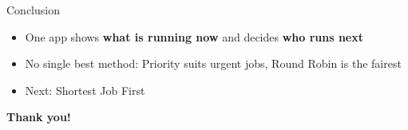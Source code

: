 \documentclass[aspectratio=169,11pt]{beamer}
\begin{document}
\begin{frame}{Conclusion}
  \begin{itemize}
    \item One app shows \textbf{what is running now} and decides \textbf{who runs next}
    \item No single best method: Priority suits urgent jobs, Round Robin is the fairest
    \item Next: Shortest Job First
  \end{itemize}
  \vspace{1cm}
  \centering
  {\fontsize{40}{48}\selectfont\bfseries\color{structure} Thank you!}\\[0.4cm]
\end{frame}
\end{document}
